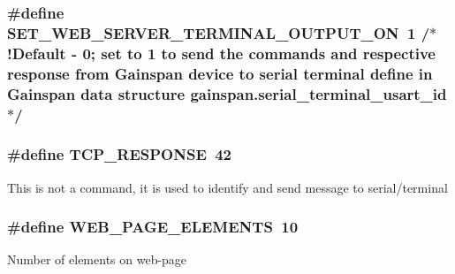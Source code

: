 \subsubsection[{\texorpdfstring{S\+E\+T\+\_\+\+W\+E\+B\+\_\+\+S\+E\+R\+V\+E\+R\+\_\+\+T\+E\+R\+M\+I\+N\+A\+L\+\_\+\+O\+U\+T\+P\+U\+T\+\_\+\+ON}{SET_WEB_SERVER_TERMINAL_OUTPUT_ON}}]{\setlength{\rightskip}{0pt plus 5cm}\#define S\+E\+T\+\_\+\+W\+E\+B\+\_\+\+S\+E\+R\+V\+E\+R\+\_\+\+T\+E\+R\+M\+I\+N\+A\+L\+\_\+\+O\+U\+T\+P\+U\+T\+\_\+\+ON~1				/$\ast$!Default -\/ 0; set to 1 to send the commands and respective response from Gainspan device to serial terminal define in Gainspan data structure gainspan.\+serial\+\_\+terminal\+\_\+usart\+\_\+id$\ast$/}\hypertarget{group__wireless__interface_gad4025f2e762d2d7957a3c511ce1b0205}{}\label{group__wireless__interface_gad4025f2e762d2d7957a3c511ce1b0205}
\subsubsection[{\texorpdfstring{T\+C\+P\+\_\+\+R\+E\+S\+P\+O\+N\+SE}{TCP_RESPONSE}}]{\setlength{\rightskip}{0pt plus 5cm}\#define T\+C\+P\+\_\+\+R\+E\+S\+P\+O\+N\+SE~42}\hypertarget{group__wireless__interface_ga26775cbb82cb880b7ddd90a24ed1a589}{}\label{group__wireless__interface_ga26775cbb82cb880b7ddd90a24ed1a589}
This is not a command, it is used to identify and send message to serial/terminal 
\subsubsection[{\texorpdfstring{W\+E\+B\+\_\+\+P\+A\+G\+E\+\_\+\+E\+L\+E\+M\+E\+N\+TS}{WEB_PAGE_ELEMENTS}}]{\setlength{\rightskip}{0pt plus 5cm}\#define W\+E\+B\+\_\+\+P\+A\+G\+E\+\_\+\+E\+L\+E\+M\+E\+N\+TS~10}\hypertarget{group__wireless__interface_ga494d4bc8995ae2fde8093a5e0f3c3936}{}\label{group__wireless__interface_ga494d4bc8995ae2fde8093a5e0f3c3936}
Number of elements on web-\/page 
